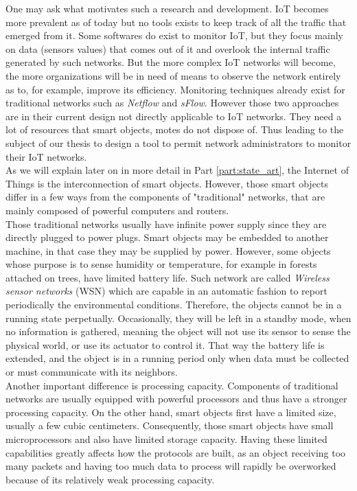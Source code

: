 One may ask what motivates such a research and development. IoT becomes more prevalent as of today but no tools exists to keep track of all the traffic that emerged from it. Some softwares do exist to monitor IoT, but they focus mainly on data (sensors values) that comes out of it and overlook the internal traffic generated by such networks. But the more complex IoT networks will become, the more organizations will be in need of means to observe the network entirely as to, for example, improve its efficiency. Monitoring techniques already exist for traditional networks such as \textit{Netflow} and \textit{sFlow}. However those two approaches are in their current design not directly applicable to IoT networks. They need a lot of resources that smart objects, motes do not dispose of. Thus leading to the subject of our thesis to design a tool to permit network administrators to monitor their IoT networks.\\

As we will explain later on in more detail in Part \ref{part:state_art}, the Internet of Things is the interconnection of smart objects. However, those smart objects differ in a few ways from the components of "traditional" networks, that are mainly composed of powerful computers and routers.\\

Those traditional networks usually have infinite power supply since they are directly plugged to power plugs. Smart objects may be embedded to another machine, in that case they may be supplied by power. However, some objects whose purpose is to sense humidity or temperature, for example in forests attached on trees, have limited battery life.  Such network are called \textit{Wireless sensor networks} (WSN) which are capable in an automatic fashion to report periodically the environmental conditions. Therefore, the objects cannot be in a running state perpetually. Occasionally, they will be left in a standby mode, when no information is gathered, meaning the object will not use its sensor to sense the physical world, or use its actuator to control it. That way the battery life is extended, and the object is in a running period only when data must be collected or must communicate with its neighbors. \\

Another important difference is processing capacity. Components of traditional networks are usually equipped with powerful processors and thus have a stronger processing capacity. On the other hand, smart objects first have a limited size, usually a few cubic centimeters. Consequently, those smart objects have small microprocessors and also have limited storage capacity. Having these limited capabilities greatly affects how the protocols are built, as an object receiving too many packets and having too much data to process will rapidly be overworked because of its relatively weak processing capacity. \\

